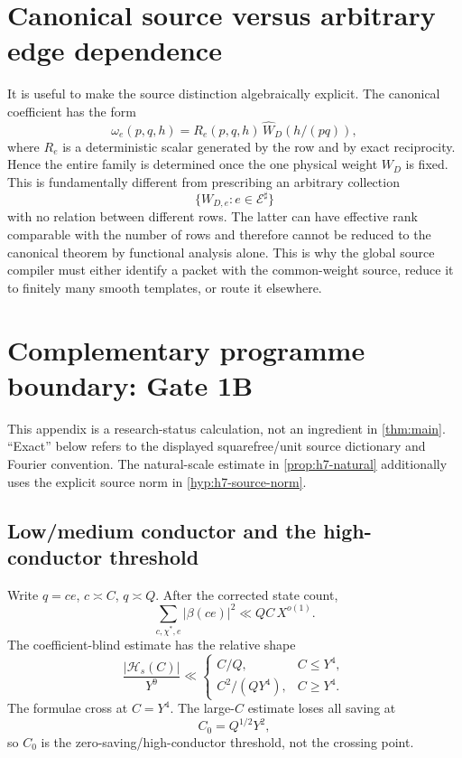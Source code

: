 \documentclass[11pt]{article}
\theoremstyle{definition}
\newcommand{\1}{\mathbf 1}
\newcommand{\E}{\mathcal E}
\begin{document}
\section{Canonical source versus arbitrary edge dependence}
\label{app:edge-dependence}

It is useful to make the source distinction algebraically explicit.  The
canonical coefficient has the form
\[
   \omega_e(p,q,h)
   =R_e(p,q,h)\,\widehat W_D(h/(pq)),
\]
where $R_e$ is a deterministic scalar generated by the row and by exact
reciprocity.  Hence the entire family is determined once the one physical
weight $W_D$ is fixed.  This is fundamentally different from prescribing an
arbitrary collection
\[
   \{W_{D,e}:e\in\E^\sharp\}
\]
with no relation between different rows.  The latter can have effective rank
comparable with the number of rows and therefore cannot be reduced to the
canonical theorem by functional analysis alone.  This is why the global
source compiler must either identify a packet with the common-weight source,
reduce it to finitely many smooth templates, or route it elsewhere.



\section{Complementary programme boundary: Gate 1B}
\label{app:gate1b-frontier}
This appendix is a research-status calculation, not an ingredient in
\cref{thm:main}.  ``Exact'' below refers to the displayed squarefree/unit
source dictionary and Fourier convention.  The natural-scale estimate in
\cref{prop:h7-natural} additionally uses the explicit source norm in
\cref{hyp:h7-source-norm}.

\subsection{Low/medium conductor and the high-conductor threshold}
Write $q=ce$, $c\asymp C$, $q\asymp Q$.  After the corrected state count,
\[
   \sum_{c,\chi^\ast,e}|\beta(ce)|^2\ll QC\,X^{o(1)}.
\]
The coefficient-blind estimate has the relative shape
\[
 \frac{|\mathcal H_s(C)|}{Y^9}
 \ll
 \begin{cases}
  C/Q,& C\le Y^4,\\
  C^2/(QY^4),& C\ge Y^4.
 \end{cases}
\]
The formulae cross at $C=Y^4$.  The large-$C$ estimate loses all saving at
\[
   C_0=Q^{1/2}Y^2,
\]
so $C_0$ is the zero-saving/high-conductor threshold, not the crossing point.
\end{document}
